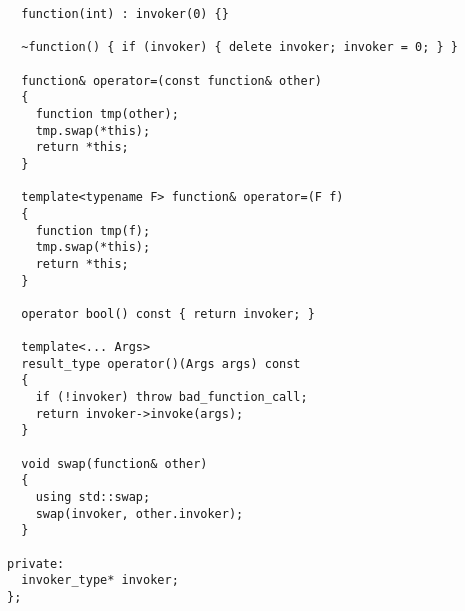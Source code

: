 \documentclass{article}
\begin{document}
\begin{verbatim}
  function(int) : invoker(0) {}
  
  ~function() { if (invoker) { delete invoker; invoker = 0; } }

  function& operator=(const function& other)
  {
    function tmp(other);
    tmp.swap(*this);
    return *this;
  }
  
  template<typename F> function& operator=(F f)
  {
    function tmp(f);
    tmp.swap(*this);
    return *this;
  }
  
  operator bool() const { return invoker; }

  template<... Args>
  result_type operator()(Args args) const
  {
    if (!invoker) throw bad_function_call;
    return invoker->invoke(args);
  }
  
  void swap(function& other)
  {
    using std::swap;
    swap(invoker, other.invoker);
  }
  
private:
  invoker_type* invoker;
};
\end{verbatim}
\normalsize



\end{document}
